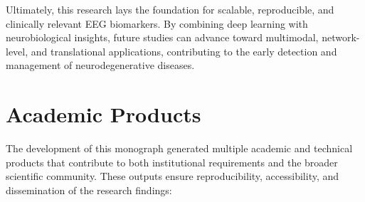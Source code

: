 \documentclass[12pt,a4paper]{article}
\begin{document}
Ultimately, this research lays the foundation for scalable, reproducible, and clinically relevant EEG biomarkers. By combining deep learning with neurobiological insights, future studies can advance toward multimodal, network-level, and translational applications, contributing to the early detection and management of neurodegenerative diseases.

\section{Academic Products}

The development of this monograph generated multiple academic and technical products that contribute to both institutional requirements and the broader scientific community. These outputs ensure reproducibility, accessibility, and dissemination of the research findings:
\end{document}
